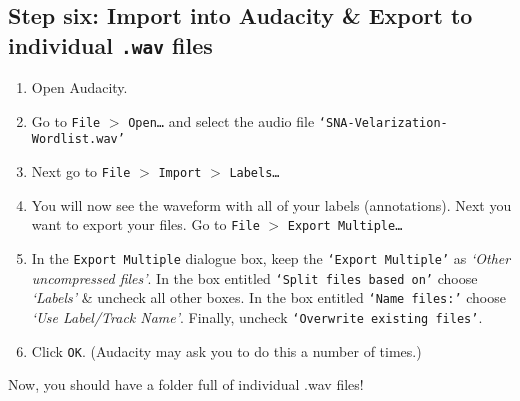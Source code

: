 \documentclass[letterpaper,12pt]{article}
\begin{document}
\subsection*{Step six: Import into Audacity \& Export to individual \texttt{.wav} files }
\begin{enumerate}
  \item Open Audacity.
  \item Go to \texttt{File} $>$ \texttt{Open\ldots} and select the audio file \texttt{`SNA-Velarization-Wordlist.wav'}
  \item Next go to \texttt{File} $>$ \texttt{Import} $>$ \texttt{Labels\ldots}
  \item You will now see the waveform with all of your labels (annotations). Next you want to export your files. Go to \texttt{File} $>$ \texttt{Export Multiple\ldots}
  \item In the \texttt{Export Multiple} dialogue box, keep the \texttt{`Export Multiple'} as \textit{`Other uncompressed files'}. In the box entitled \texttt{`Split files based on'} choose \textit{`Labels'} \& uncheck all other boxes. In the box entitled \texttt{`Name files:'} choose \textit{`Use Label/Track Name'}. Finally, uncheck \texttt{`Overwrite existing files'}.
  \item Click \texttt{OK}. (Audacity may ask you to do this a number of times.)
\end{enumerate}
Now, you should have a folder full of  individual .wav files!
\end{document}
